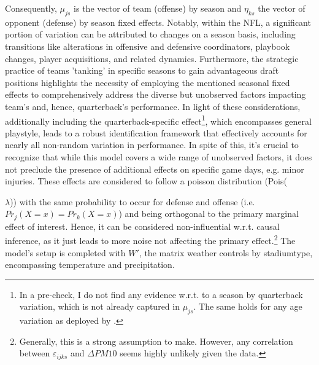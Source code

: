 \documentclass[12pt,a4paper]{article}
\begin{document}
Consequently, $\mu_{js}$ is the vector of team (offense) by season and $\eta_{ks}$ the vector of opponent (defense) by season fixed effects. Notably, within the NFL, a significant portion of variation can be attributed to changes on a season basis, including transitions like alterations in offensive and defensive coordinators, playbook changes, player acquisitions, and related dynamics. Furthermore, the strategic practice of teams 'tanking' in specific seasons to gain advantageous draft positions highlights the necessity of employing the mentioned seasonal fixed effects to comprehensively address the diverse but unobserved factors impacting team's and, hence, quarterback's performance. In light of these considerations, additionally including the quarterback-specific effect\footnote{In a pre-check, I do not find any evidence w.r.t. to a season by quarterback variation, which is not already captured in $\mu_{js}$. The same holds for any age variation as deployed by \citet{heintz2022}.}, which encompasses general playstyle, leads to a robust identification framework that effectively accounts for nearly all non-random variation in performance. In spite of this, it's crucial to recognize that while this model covers a wide range of unobserved factors, it does not preclude the presence of additional effects on specific game days, e.g. minor injuries. These effects are considered to follow a poisson distribution (Pois({$\lambda$)) with the same probability to occur for defense and offense (i.e. $Pr_j(X=x) = Pr_k(X=x)$) and being orthogonal to the primary marginal effect of interest. Hence, it can be considered non-influential w.r.t. causal inference, as it just leads to more noise not affecting the primary effect.\footnote{Generally, this is a strong assumption to make. However, any correlation between $\varepsilon_{ijks}$ and $\Delta PM10$ seems highly unlikely given the data.} The model's setup is completed with ${W'}$, the matrix weather controls by stadiumtype, encompassing temperature and precipitation.

}
\end{document}
